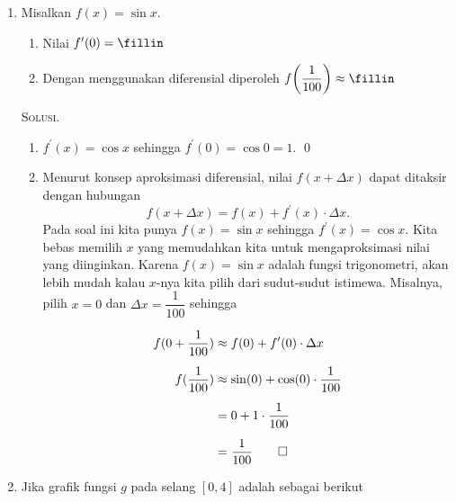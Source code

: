 \documentclass{exam}
\renewenvironment{proof}[1][Solusi.]{\ProofBox\strut\textsc{#1}\space}{\endProofBox}
\numberwithin{equation}{section}
\begin{document}
\begin{enumerate}
\item Misalkan $f(x) = \sin x$.
\begin{enumerate}
    \item Nilai $f^\prime(0) = \fillin$
    \item Dengan menggunakan diferensial diperoleh $f\qty(\dfrac{1}{100}) \approx \fillin$
\end{enumerate}
\begin{proof}
    \begin{enumerate}[label=(\alph*)]
        \item $f^\prime(x) = \cos x$ sehingga $f^\prime(0) = \cos 0 = 1$. \qed
        \item Menurut konsep aproksimasi diferensial, nilai $f(x + \Delta x)$ dapat ditaksir dengan hubungan
        \[f(x + \Delta x) = f(x) + f^\prime(x) \cdot \Delta x.\]
        Pada soal ini kita punya $f(x) = \sin x$ sehingga $f^\prime(x) = \cos x$. Kita bebas memilih $x$ yang memudahkan kita untuk mengaproksimasi nilai yang diinginkan. Karena $f(x) = \sin x$ adalah fungsi trigonometri, akan lebih mudah kalau $x$-nya kita pilih dari sudut-sudut istimewa. Misalnya, pilih $x = 0$ dan $\Delta x = \dfrac{1}{100}$ sehingga

        \vspace{-1em}
        \begin{align*}
            f(0 + \frac{1}{100})    &\approx f(0) + f^\prime(0) \cdot \Delta x      \\[.5em]
            f(\frac{1}{100})        &\approx \sin(0) + \cos(0) \cdot \frac{1}{100}  \\[.5em]
                                    &= 0 + 1 \cdot \frac{1}{100}                    \\[.5em]
                                    &= \frac{1}{100} \qed
        \end{align*}

    \end{enumerate}
\end{proof}\vspace{1em}
\item Jika grafik fungsi $g$ pada selang $[0,4]$ adalah sebagai berikut

    {\centering
\begin{tikzpicture}[x=0.75pt,y=0.75pt,yscale=-1,xscale=1]


\end{tikzpicture}}
\end{enumerate}
\end{document}
